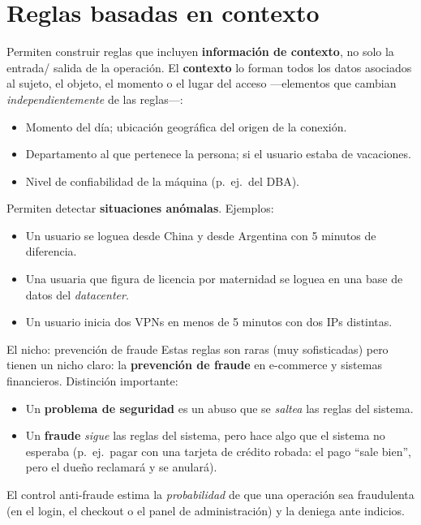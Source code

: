\documentclass[11pt,a4paper]{article}
\begin{document}
\section{Reglas basadas en contexto}

Permiten construir reglas que incluyen \textbf{información de contexto}, no solo la entrada/
salida de la operación. El \textbf{contexto} lo forman todos los datos asociados al sujeto, el
objeto, el momento o el lugar del acceso —elementos que cambian \emph{independientemente} de
las reglas—:
\begin{itemize}[leftmargin=1.4em,itemsep=1pt]
  \item Momento del día; ubicación geográfica del origen de la conexión.
  \item Departamento al que pertenece la persona; si el usuario estaba de vacaciones.
  \item Nivel de confiabilidad de la máquina (p.\ ej.\ del DBA).
\end{itemize}

Permiten detectar \textbf{situaciones anómalas}. Ejemplos:
\begin{itemize}[leftmargin=1.4em,itemsep=1pt]
  \item Un usuario se loguea desde China y desde Argentina con 5 minutos de diferencia.
  \item Una usuaria que figura de licencia por maternidad se loguea en una base de datos del
        \emph{datacenter}.
  \item Un usuario inicia dos VPNs en menos de 5 minutos con dos IPs distintas.
\end{itemize}

\begin{anecbox}{El nicho: prevención de fraude}
Estas reglas son raras (muy sofisticadas) pero tienen un nicho claro: la \textbf{prevención de
fraude} en e-commerce y sistemas financieros. Distinción importante:
\begin{itemize}[leftmargin=1.4em,itemsep=1pt]
  \item Un \textbf{problema de seguridad} es un abuso que se \emph{saltea} las reglas del
        sistema.
  \item Un \textbf{fraude} \emph{sigue} las reglas del sistema, pero hace algo que el sistema
        no esperaba (p.\ ej.\ pagar con una tarjeta de crédito robada: el pago ``sale bien'',
        pero el dueño reclamará y se anulará).
\end{itemize}
El control anti-fraude estima la \emph{probabilidad} de que una operación sea fraudulenta
(en el login, el checkout o el panel de administración) y la deniega ante indicios.
\end{anecbox}
\end{document}

